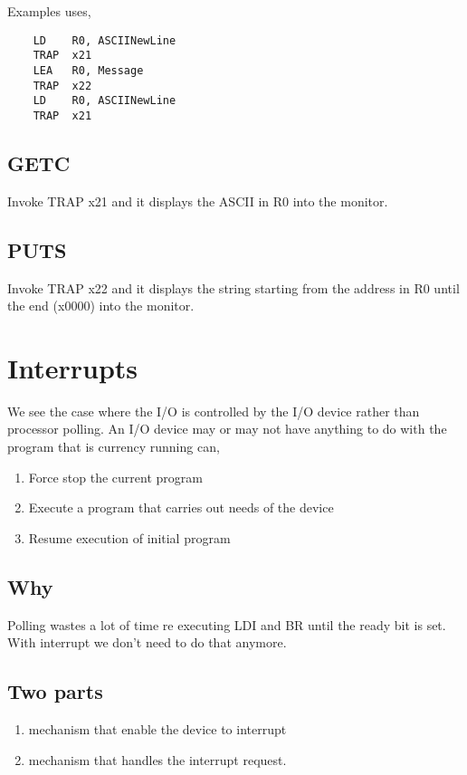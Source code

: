 Examples uses, 

\begin{verbatim}
    LD    R0, ASCIINewLine
    TRAP  x21
    LEA   R0, Message
    TRAP  x22
    LD    R0, ASCIINewLine
    TRAP  x21
\end{verbatim}

\subsection{GETC}
Invoke TRAP x21 and it displays the ASCII in R0 into the monitor.

\subsection{PUTS}
Invoke TRAP x22 and it displays the string starting from the address in R0 until the end (x0000) into the monitor.


\section{Interrupts}
We see the case where the I/O is controlled by the I/O device rather than processor polling. An I/O device may or may not have anything to do with the program that is currency running can, \begin{enumerate}
    \item Force stop the current program
    \item Execute a program that carries out needs of the device
    \item Resume execution of initial program
\end{enumerate}

\subsection{Why}
Polling wastes a lot of time re executing LDI and BR until the ready bit is set. With interrupt we don't need to do that anymore.

\subsection{Two parts}
\begin{enumerate}
    \item mechanism that enable the device to interrupt
    \item mechanism that handles the interrupt request.
\end{enumerate}


